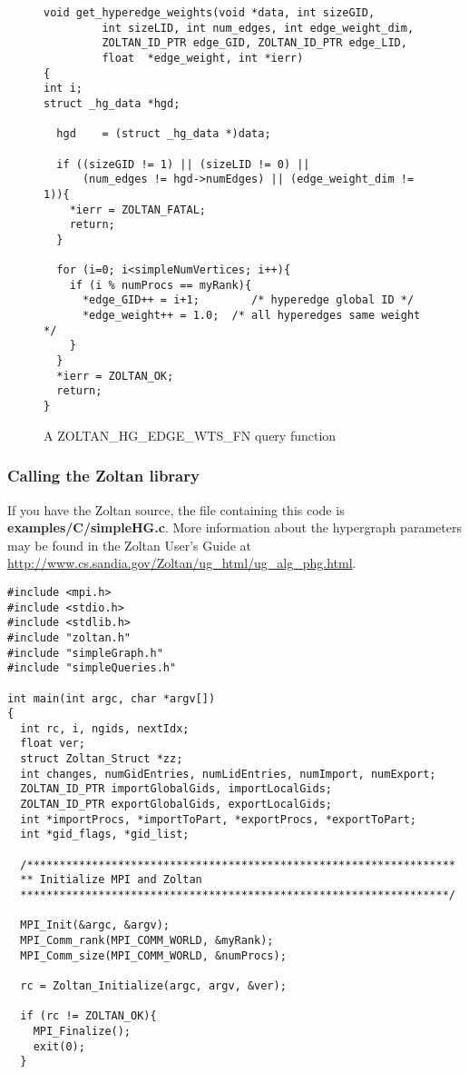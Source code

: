 \begin{figure}
\begin{flushleft}
\begin{verbatim}
void get_hyperedge_weights(void *data, int sizeGID,
         int sizeLID, int num_edges, int edge_weight_dim,
         ZOLTAN_ID_PTR edge_GID, ZOLTAN_ID_PTR edge_LID,
         float  *edge_weight, int *ierr)
{
int i;
struct _hg_data *hgd;

  hgd    = (struct _hg_data *)data;

  if ((sizeGID != 1) || (sizeLID != 0) ||
      (num_edges != hgd->numEdges) || (edge_weight_dim != 1)){
    *ierr = ZOLTAN_FATAL;
    return;
  }

  for (i=0; i<simpleNumVertices; i++){
    if (i % numProcs == myRank){
      *edge_GID++ = i+1;        /* hyperedge global ID */
      *edge_weight++ = 1.0;  /* all hyperedges same weight */
    }
  }
  *ierr = ZOLTAN_OK;
  return;
}
\end{verbatim}
\end{flushleft}
\caption{A ZOLTAN\_HG\_EDGE\_WTS\_FN query function}
\label{fig:EW}
\end{figure}

\clearpage
\subsubsection{Calling the Zoltan library}
If you have the Zoltan source, the file containing this
code is \textbf{examples/C/simpleHG.c}.
More information about the hypergraph parameters
may be found in the Zoltan User's Guide at
\url{http://www.cs.sandia.gov/Zoltan/ug_html/ug_alg_phg.html}.

\begin{flushleft}
\begin{verbatim}
#include <mpi.h>
#include <stdio.h>
#include <stdlib.h>
#include "zoltan.h"
#include "simpleGraph.h"
#include "simpleQueries.h"

int main(int argc, char *argv[])
{
  int rc, i, ngids, nextIdx;
  float ver;
  struct Zoltan_Struct *zz;
  int changes, numGidEntries, numLidEntries, numImport, numExport;
  ZOLTAN_ID_PTR importGlobalGids, importLocalGids;
  ZOLTAN_ID_PTR exportGlobalGids, exportLocalGids;
  int *importProcs, *importToPart, *exportProcs, *exportToPart;
  int *gid_flags, *gid_list;

  /******************************************************************
  ** Initialize MPI and Zoltan
  ******************************************************************/

  MPI_Init(&argc, &argv);
  MPI_Comm_rank(MPI_COMM_WORLD, &myRank);
  MPI_Comm_size(MPI_COMM_WORLD, &numProcs);

  rc = Zoltan_Initialize(argc, argv, &ver);

  if (rc != ZOLTAN_OK){
    MPI_Finalize();
    exit(0);
  }
\end{verbatim}
\end{flushleft}

